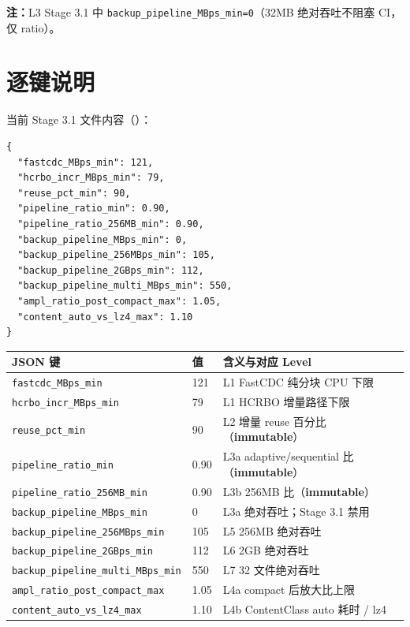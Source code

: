 \textbf{注：}L3 Stage 3.1 中 \texttt{backup\_pipeline\_MBps\_min=0}（32MB 绝对吞吐不阻塞 CI，仅 ratio）。

\section{ 逐键说明}

当前 Stage 3.1 文件内容（）：

\begin{lstlisting}[caption={ci\_floor.json 全文},label={lst:ci-floor}]
{
  "fastcdc_MBps_min": 121,
  "hcrbo_incr_MBps_min": 79,
  "reuse_pct_min": 90,
  "pipeline_ratio_min": 0.90,
  "pipeline_ratio_256MB_min": 0.90,
  "backup_pipeline_MBps_min": 0,
  "backup_pipeline_256MBps_min": 105,
  "backup_pipeline_2GBps_min": 112,
  "backup_pipeline_multi_MBps_min": 550,
  "ampl_ratio_post_compact_max": 1.05,
  "content_auto_vs_lz4_max": 1.10
}
\end{lstlisting}

\begin{longtable}{@{}llp{7.5cm}@{}}
\toprule
JSON 键 & 值 & 含义与对应 Level \\
\midrule
\texttt{fastcdc\_MBps\_min} & 121 & L1 FastCDC 纯分块 CPU 下限 \\
\texttt{hcrbo\_incr\_MBps\_min} & 79 & L1 HCRBO 增量路径下限 \\
\texttt{reuse\_pct\_min} & 90 & L2 增量 reuse 百分比（\textbf{immutable}） \\
\texttt{pipeline\_ratio\_min} & 0.90 & L3a adaptive/sequential 比（\textbf{immutable}） \\
\texttt{pipeline\_ratio\_256MB\_min} & 0.90 & L3b 256MB 比（\textbf{immutable}） \\
\texttt{backup\_pipeline\_MBps\_min} & 0 & L3a 绝对吞吐；Stage 3.1 禁用 \\
\texttt{backup\_pipeline\_256MBps\_min} & 105 & L5 256MB 绝对吞吐 \\
\texttt{backup\_pipeline\_2GBps\_min} & 112 & L6 2GB 绝对吞吐 \\
\texttt{backup\_pipeline\_multi\_MBps\_min} & 550 & L7 32 文件绝对吞吐 \\
\texttt{ampl\_ratio\_post\_compact\_max} & 1.05 & L4a compact 后放大比上限 \\
\texttt{content\_auto\_vs\_lz4\_max} & 1.10 & L4b ContentClass auto 耗时 / lz4 \\
\bottomrule
\end{longtable}

